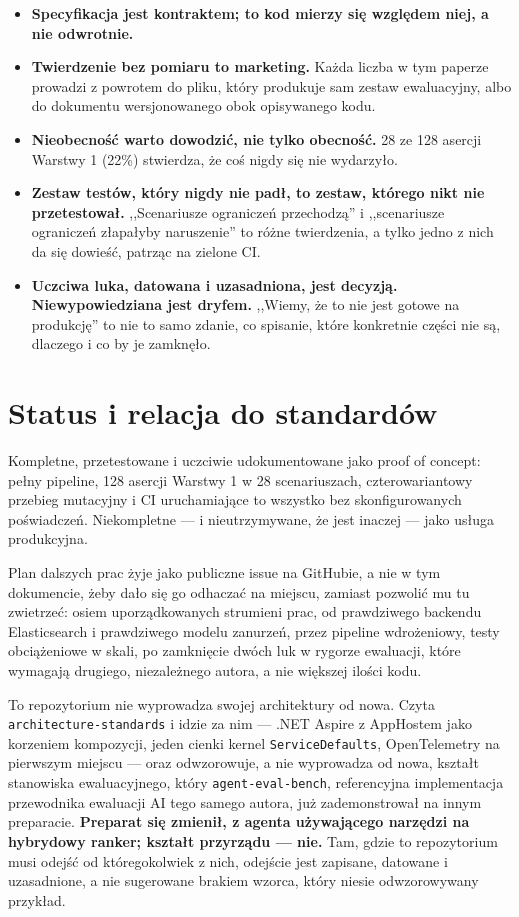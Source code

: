 \documentclass[11pt,a4paper]{article}
\newcommand{\finding}[1]{{\color{primaryblue}\textbf{#1}}}
\begin{document}
\begin{itemize}[leftmargin=1.4em]
  \item \textbf{Specyfikacja jest kontraktem; to kod mierzy się względem niej,
        a nie odwrotnie.}
  \item \textbf{Twierdzenie bez pomiaru to marketing.} Każda liczba w tym
        paperze prowadzi z powrotem do pliku, który produkuje sam zestaw
        ewaluacyjny, albo do dokumentu wersjonowanego obok opisywanego kodu.
  \item \textbf{Nieobecność warto dowodzić, nie tylko obecność.} 28 ze 128
        asercji Warstwy 1 (22\%) stwierdza, że coś nigdy się nie wydarzyło.
  \item \textbf{Zestaw testów, który nigdy nie padł, to zestaw, którego nikt
        nie przetestował.} ,,Scenariusze ograniczeń przechodzą'' i
        ,,scenariusze ograniczeń złapałyby naruszenie'' to różne twierdzenia, a
        tylko jedno z nich da się dowieść, patrząc na zielone CI.
  \item \textbf{Uczciwa luka, datowana i uzasadniona, jest decyzją.
        Niewypowiedziana jest dryfem.} ,,Wiemy, że to nie jest gotowe na
        produkcję'' to nie to samo zdanie, co spisanie, które konkretnie części
        nie są, dlaczego i co by je zamknęło.
\end{itemize}

\section{Status i relacja do standardów}

Kompletne, przetestowane i uczciwie udokumentowane jako proof of concept:
pełny pipeline, 128 asercji Warstwy 1 w 28 scenariuszach, czterowariantowy
przebieg mutacyjny i CI uruchamiające to wszystko bez skonfigurowanych
poświadczeń. Niekompletne --- i nieutrzymywane, że jest inaczej --- jako
usługa produkcyjna.

Plan dalszych prac żyje jako publiczne issue na GitHubie, a nie w tym
dokumencie, żeby dało się go odhaczać na miejscu, zamiast pozwolić mu tu
zwietrzeć: osiem uporządkowanych strumieni prac, od prawdziwego backendu
Elasticsearch i prawdziwego modelu zanurzeń, przez pipeline wdrożeniowy, testy
obciążeniowe w skali, po zamknięcie dwóch luk w rygorze ewaluacji, które
wymagają drugiego, niezależnego autora, a nie większej ilości kodu.

To repozytorium nie wyprowadza swojej architektury od nowa. Czyta
\texttt{architecture-standards} i idzie za nim --- .NET Aspire z AppHostem
jako korzeniem kompozycji, jeden cienki kernel \texttt{ServiceDefaults},
OpenTelemetry na pierwszym miejscu --- oraz odwzorowuje, a nie wyprowadza od
nowa, kształt stanowiska ewaluacyjnego, który \texttt{agent-eval-bench},
referencyjna implementacja przewodnika ewaluacji AI tego samego autora, już
zademonstrował na innym preparacie. \finding{Preparat się zmienił, z agenta
używającego narzędzi na hybrydowy ranker; kształt przyrządu --- nie.} Tam,
gdzie to repozytorium musi odejść od któregokolwiek z nich, odejście jest
zapisane, datowane i uzasadnione, a nie sugerowane brakiem wzorca, który
niesie odwzorowywany przykład.
\end{document}
